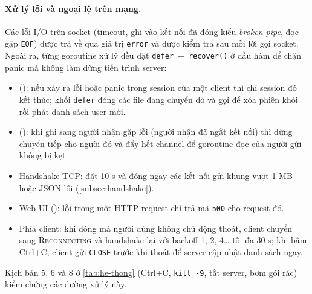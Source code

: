 \paragraph{Xử lý lỗi và ngoại lệ trên mạng.} Các lỗi I/O trên socket (timeout, ghi vào kết nối đã đóng kiểu
\emph{broken pipe}, đọc gặp \texttt{EOF}) được trả về qua giá trị \texttt{error} và được kiểm tra sau mỗi lời gọi
socket. Ngoài ra, từng goroutine xử lý đều đặt \texttt{defer}~+~\texttt{recover()} ở đầu hàm để chặn panic mà không làm dừng tiến trình server:
\begin{itemize}
  \item {} (): nếu xảy ra lỗi hoặc panic trong session của một client thì chỉ
        session đó kết thúc; khối \texttt{defer} đóng các file đang chuyển dở và gọi  để xóa
        phiên khỏi  rồi phát danh sách user mới.
  \item {} (): khi ghi sang người nhận gặp lỗi (người nhận đã ngắt kết nối) thì dừng
        chuyển tiếp cho người đó và đẩy hết channel để goroutine đọc của người gửi không bị kẹt.
  \item Handshake TCP: đặt  10 s và đóng ngay các kết nối gửi khung vượt 1 MB hoặc JSON lỗi
        (\cref{subsec:handshake}).
  \item Web UI (): lỗi trong một HTTP request chỉ trả mã \texttt{500} cho request đó.
  \item Phía client: khi  đóng mà người dùng không chủ động thoát, client chuyển sang
        \textsc{Reconnecting} và handshake lại với backoff 1, 2, 4\dots{} tối đa 30 s; khi bấm Ctrl+C, client gửi
        \texttt{CLOSE} trước khi thoát để server cập nhật danh sách ngay.
\end{itemize}
Kịch bản 5, 6 và 8 ở \cref{tab:he-thong} (Ctrl+C, \texttt{kill -9}, tắt server, bơm gói rác) kiểm chứng các
đường xử lý này.
